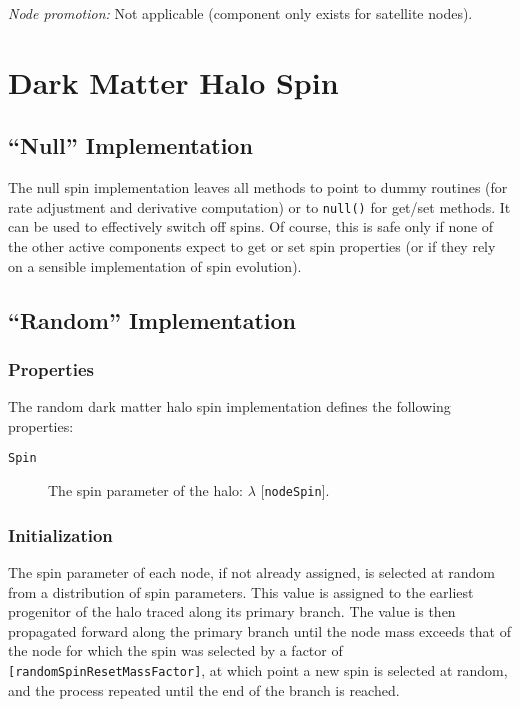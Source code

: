 \noindent\emph{Node promotion:} Not applicable (component only exists for satellite nodes).\\

\section{Dark Matter Halo Spin}

\subsection{``Null'' Implementation}

The null spin implementation leaves all methods to point to dummy routines (for rate adjustment and derivative computation) or to {\tt null()} for get/set methods. It can be used to effectively switch off spins. Of course, this is safe only if none of the other active components expect to get or set spin properties (or if they rely on a sensible implementation of spin evolution).

\subsection{``Random'' Implementation}

\subsubsection{Properties}

The random dark matter halo spin implementation defines the following properties:
\begin{description}
 \item [{\tt Spin}] The spin parameter of the halo: $\lambda$ [{\tt nodeSpin}].
\end{description}

\subsubsection{Initialization}

The spin parameter of each node, if not already assigned, is selected at random from a distribution of spin parameters. This value is assigned to the earliest progenitor of the halo traced along its primary branch. The value is then propagated forward along the primary branch until the node mass exceeds that of the node for which the spin was selected by a factor of {\tt [randomSpinResetMassFactor]}, at which point a new spin is selected at random, and the process repeated until the end of the branch is reached. 


